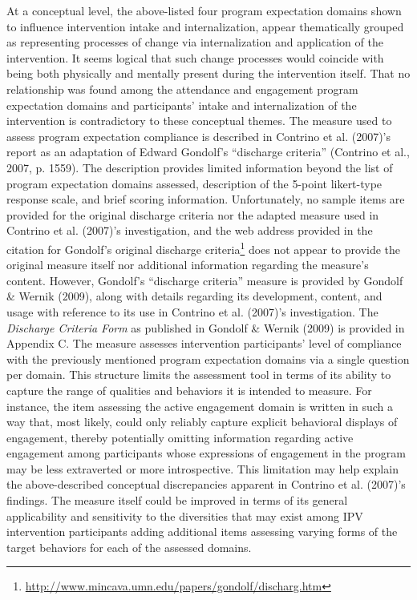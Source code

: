 \documentclass[11pt,]{tufte-book}
\begin{document}
At a conceptual level, the above-listed four program expectation domains
shown to influence intervention intake and internalization, appear
thematically grouped as representing processes of change via
internalization and application of the intervention. It seems logical
that such change processes would coincide with being both physically and
mentally present during the intervention itself. That no relationship
was found among the attendance and engagement program expectation
domains and participants' intake and internalization of the intervention
is contradictory to these conceptual themes. The measure used to assess
program expectation compliance is described in Contrino et al. (2007)'s
report as an adaptation of Edward Gondolf's ``discharge criteria''
(Contrino et al., 2007, p. 1559). The description provides limited
information beyond the list of program expectation domains assessed,
description of the 5-point likert-type response scale, and brief scoring
information. Unfortunately, no sample items are provided for the
original discharge criteria nor the adapted measure used in Contrino et
al. (2007)'s investigation, and the web address provided in the citation
for Gondolf's original discharge criteria\footnote{\url{http://www.mincava.umn.edu/papers/gondolf/discharg.htm}}
does not appear to provide the original measure itself nor additional
information regarding the measure's content. However, Gondolf's
``discharge criteria'' measure is provided by Gondolf \& Wernik (2009),
along with details regarding its development, content, and usage with
reference to its use in Contrino et al. (2007)'s investigation. The
\emph{Discharge Criteria Form} as published in Gondolf \& Wernik (2009)
is provided in Appendix C. The measure assesses intervention
participants' level of compliance with the previously mentioned program
expectation domains via a single question per domain. This structure
limits the assessment tool in terms of its ability to capture the range
of qualities and behaviors it is intended to measure. For instance, the
item assessing the active engagement domain is written in such a way
that, most likely, could only reliably capture explicit behavioral
displays of engagement, thereby potentially omitting information
regarding active engagement among participants whose expressions of
engagement in the program may be less extraverted or more introspective.
This limitation may help explain the above-described conceptual
discrepancies apparent in Contrino et al. (2007)'s findings. The measure
itself could be improved in terms of its general applicability and
sensitivity to the diversities that may exist among IPV intervention
participants adding additional items assessing varying forms of the
target behaviors for each of the assessed domains.
\end{document}
